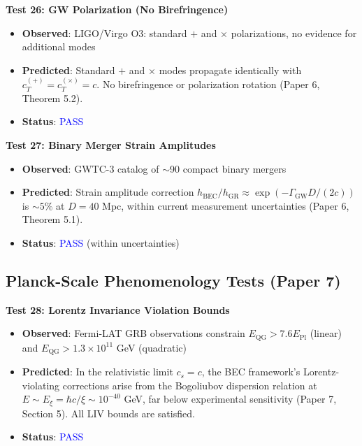 \documentclass[11pt,a4paper]{article}
\theoremstyle{definition}
\theoremstyle{remark}
\begin{document}
\textbf{Test 26: GW Polarization (No Birefringence)}

\begin{itemize}[leftmargin=*, itemsep=0.1em]
\item \textbf{Observed}: LIGO/Virgo O3: standard $+$ and $\times$ polarizations, no evidence for additional modes
\item \textbf{Predicted}: Standard $+$ and $\times$ modes propagate identically with $c_T^{(+)} = c_T^{(\times)} = c$. No birefringence or polarization rotation (Paper 6, Theorem 5.2).
\item \textbf{Status}: \textcolor{blue}{PASS}
\end{itemize}

\textbf{Test 27: Binary Merger Strain Amplitudes}

\begin{itemize}[leftmargin=*, itemsep=0.1em]
\item \textbf{Observed}: GWTC-3 catalog of $\sim$90 compact binary mergers
\item \textbf{Predicted}: Strain amplitude correction $h_{\mathrm{BEC}}/h_{\mathrm{GR}} \approx \exp(-\Gamma_{\mathrm{GW}}D/(2c))$ is $\sim 5\%$ at $D = 40$ Mpc, within current measurement uncertainties (Paper 6, Theorem 5.1).
\item \textbf{Status}: \textcolor{blue}{PASS} (within uncertainties)
\end{itemize}

\subsection{Planck-Scale Phenomenology Tests (Paper 7)}
\label{sec:tests_planck}

\textbf{Test 28: Lorentz Invariance Violation Bounds}

\begin{itemize}[leftmargin=*, itemsep=0.1em]
\item \textbf{Observed}: Fermi-LAT GRB observations constrain $E_{\mathrm{QG}} > 7.6 E_{\mathrm{Pl}}$ (linear) and $E_{\mathrm{QG}} > 1.3 \times 10^{11}$ GeV (quadratic)
\item \textbf{Predicted}: In the relativistic limit $c_s = c$, the BEC framework's Lorentz-violating corrections arise from the Bogoliubov dispersion relation at $E \sim E_\xi = \hbar c/\xi \sim 10^{-40}$ GeV, far below experimental sensitivity (Paper 7, Section 5). All LIV bounds are satisfied.
\item \textbf{Status}: \textcolor{blue}{PASS}
\end{itemize}
\end{document}
